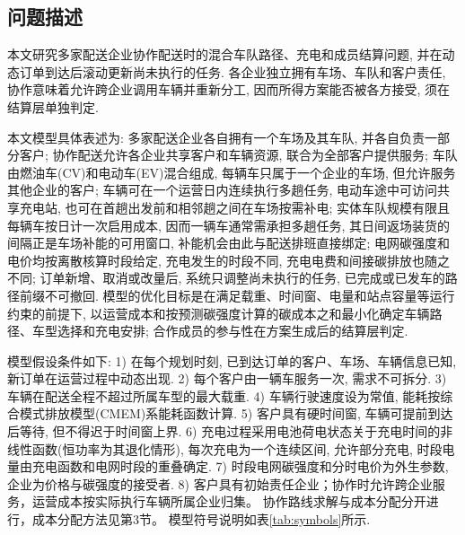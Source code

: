 \documentclass{setp-new}
\begin{document}
\subsection{问题描述}

本文研究多家配送企业协作配送时的混合车队路径、充电和成员结算问题,
并在动态订单到达后滚动更新尚未执行的任务.
各企业独立拥有车场、车队和客户责任, 协作意味着允许跨企业调用车辆并重新分工,
因而所得方案能否被各方接受, 须在结算层单独判定.

本文模型具体表述为:
多家配送企业各自拥有一个车场及其车队, 并各自负责一部分客户;
协作配送允许各企业共享客户和车辆资源, 联合为全部客户提供服务;
车队由燃油车(CV)和电动车(EV)混合组成, 每辆车只属于一个企业的车场, 但允许服务其他企业的客户;
车辆可在一个运营日内连续执行多趟任务,
电动车途中可访问共享充电站, 也可在首趟出发前和相邻趟之间在车场按需补电;
实体车队规模有限且每辆车按日计一次启用成本, 因而一辆车通常需承担多趟任务,
其日间返场装货的间隔正是车场补能的可用窗口, 补能机会由此与配送排班直接绑定;
电网碳强度和电价均按离散核算时段给定,
充电发生的时段不同, 充电电费和间接碳排放也随之不同;
订单新增、取消或改量后, 系统只调整尚未执行的任务, 已完成或已发车的路径前缀不可撤回.
模型的优化目标是在满足载重、时间窗、电量和站点容量等运行约束的前提下,
以运营成本和按预测碳强度计算的碳成本之和最小化确定车辆路径、车型选择和充电安排;
合作成员的参与性在方案生成后的结算层判定.

模型假设条件如下:
1) 在每个规划时刻, 已到达订单的客户、车场、车辆信息已知, 新订单在运营过程中动态出现.
2) 每个客户由一辆车服务一次, 需求不可拆分.
3) 车辆在配送全程不超过所属车型的最大载重.
4) 车辆行驶速度设为常值, 能耗按综合模式排放模型(CMEM)系能耗函数\cite{ref:27,ref:36}计算.
5) 客户具有硬时间窗, 车辆可提前到达后等待, 但不得迟于时间窗上界.
6) 充电过程采用电池荷电状态关于充电时间的非线性函数(恒功率为其退化情形),
每次充电为一个连续区间, 允许部分充电, 时段电量由充电函数和电网时段的重叠确定.
7) 时段电网碳强度和分时电价为外生参数, 企业为价格与碳强度的接受者.
8) 客户具有初始责任企业；协作时允许跨企业服务，运营成本按实际执行车辆所属企业归集。
协作路线求解与成本分配分开进行，成本分配方法见第3节。
模型符号说明如表\ref{tab:symbols}所示.
\end{document}
